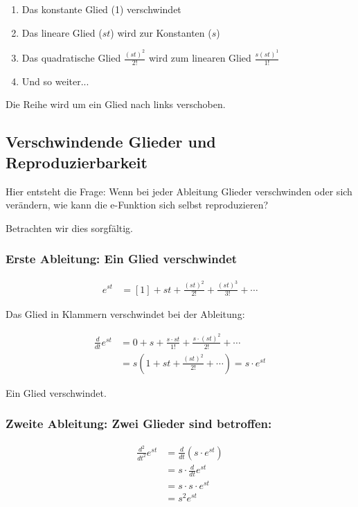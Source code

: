\documentclass[a4paper, 12pt, twoside, openright]{report}
\theoremstyle{definition}
\theoremstyle{definition}
\begin{document}
\begin{enumerate}
	\item Das konstante Glied (1) verschwindet
	\item Das lineare Glied ($st$) wird zur Konstanten ($s$)
	\item Das quadratische Glied $\frac{(st)^2}{2!}$ wird zum linearen Glied $\frac{s(st)^1}{1!}$
	\item Und so weiter...
\end{enumerate}

Die Reihe wird um ein Glied nach links verschoben.

\subsection{Verschwindende Glieder und Reproduzierbarkeit}

Hier entsteht die Frage: Wenn bei jeder Ableitung Glieder verschwinden oder sich verändern, wie kann die e-Funktion sich selbst reproduzieren?

Betrachten wir dies sorgfältig.

\subsubsection*{Erste Ableitung: Ein Glied verschwindet}

\begin{align}
	e^{st} &= \left[1\right] + st + \frac{(st)^2}{2!} + \frac{(st)^3}{3!} + \cdots
\end{align}

Das Glied in Klammern verschwindet bei der Ableitung:

\begin{align}
	\frac{d}{dt} e^{st} &= 0 + s + \frac{s \cdot st}{1!} + \frac{s \cdot (st)^2}{2!} + \cdots\\
	&= s \left(1 + st + \frac{(st)^2}{2!} + \cdots \right) = s \cdot e^{st}
\end{align}

Ein Glied verschwindet.

\subsubsection*{Zweite Ableitung: Zwei Glieder sind betroffen:}

\begin{align}
	\frac{d^2}{dt^2} e^{st} &= \frac{d}{dt} (s \cdot e^{st})\\
	&= s \cdot \frac{d}{dt} e^{st}\\
	&= s \cdot s \cdot e^{st}\\
	&= s^2 e^{st}
\end{align}
\end{document}

